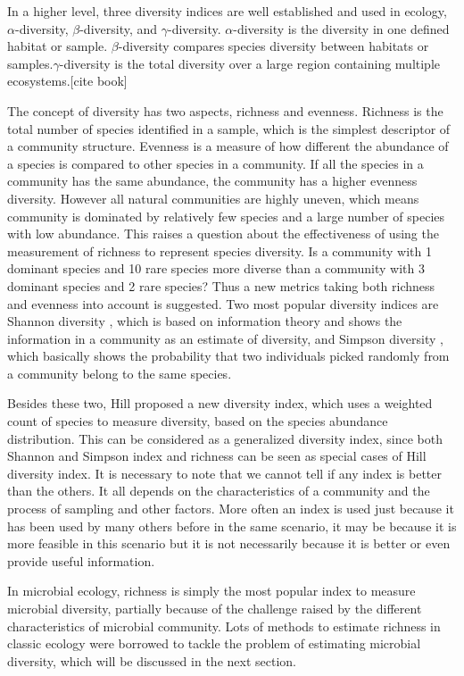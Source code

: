 In a higher level, three diversity indices are well established and used in ecology, $\alpha$-diversity, $\beta$-diversity, and 
$\gamma$-diversity. $\alpha$-diversity is the diversity in one defined habitat or sample. $\beta$-diversity compares species 
diversity between habitats or samples.$\gamma$-diversity is the total diversity over a large region containing multiple ecosystems.[cite book]

The concept of diversity has two aspects, richness and evenness. Richness is the total number of species
identified in a sample, which is the simplest descriptor of a community structure. Evenness is a measure 
of how different the abundance of a species is compared to other species in a community. If all the species in a
 community has the same abundance, the community has a higher evenness diversity. However all natural communities 
 are highly uneven, which means community is dominated by relatively few species and a large number of species
 with low abundance. This raises
 a question about the effectiveness of using the measurement of richness to represent species diversity. Is a community
 with 1 dominant species and 10 rare species more diverse than a community with 3 dominant species and 2 rare species?
  Thus a new metrics taking both richness and evenness into account is suggested. Two most popular diversity indices are Shannon diversity \cite{shannon2001mathematical},
  which is based on information theory and shows the information in a community as an estimate of diversity, and Simpson diversity \cite{simpson1949measurement},
  which basically shows the probability that two individuals picked randomly from a community belong to the same species.

Besides these two, Hill \cite{hill1973diversity} proposed a new diversity index, which uses a weighted count of species to measure 
diversity, based on the species abundance distribution. This can be considered as a generalized diversity index, 
since both Shannon and Simpson index and richness can be seen as special cases of Hill diversity index.
It is necessary to note that we cannot tell if any index is better than the others. It all depends on the characteristics
of a community and the process of sampling and other factors. More often an index is used just because it has
been used by many others before in the same scenario, it may be because it is more feasible in this scenario 
but it is not necessarily because it is better or even provide useful information.

In microbial ecology, richness is simply the most popular index to measure microbial diversity, partially because of 
the challenge raised by the different characteristics of microbial community. Lots of methods to estimate richness in classic 
ecology were borrowed to tackle the problem of estimating microbial diversity, which will be discussed in the next section.


